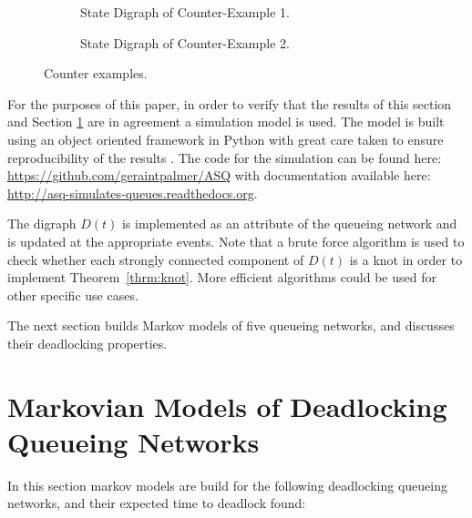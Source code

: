 \documentclass{article}
\numberwithin{equation}{section}
\begin{document}
\begin{figure}
\begin{subfigure}{0.5\textwidth}
\begin{center}

\end{center}
\caption{State Digraph of Counter-Example 1.}
\label{fig:counter_example_1}
\end{subfigure}
\begin{subfigure}{0.5\textwidth}
\begin{center}

\end{center}
\caption{State Digraph of Counter-Example 2.}
\label{fig:counter_example_2}
\end{subfigure}
\caption{Counter examples.}
\label{fig:counter_examples}
\end{figure}

For the purposes of this paper, in order to verify that the results of this
section and Section \ref{sec:markovmodels} are in agreement a simulation model
is used. The model is built using an object oriented framework in Python
\cite{python} with great care taken to ensure reproducibility of the results
\cite{hongetal15}. The code for the simulation can
be found here: \url{https://github.com/geraintpalmer/ASQ} with documentation
available here: \url{http://asq-simulates-queues.readthedocs.org}.

The digraph \(D(t)\) is implemented as an attribute of the queueing network and
is updated at the appropriate events. Note that a brute force algorithm is used
to check whether each strongly connected component of $D(t)$ is a knot in order
to implement Theorem~\ref{thrm:knot}. More efficient algorithms could be used for
other specific use cases.

The next section builds Markov models of five queueing networks, and discusses their deadlocking properties.

\section{Markovian Models of Deadlocking Queueing Networks}\label{sec:markovmodels}

In this section markov models are build for the following deadlocking queueing networks, and their expected time to deadlock found:
\end{document}

